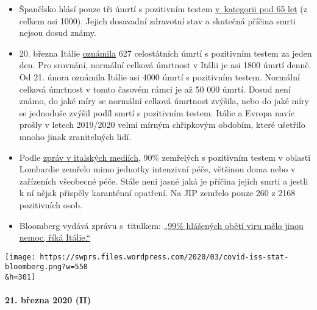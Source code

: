 \begin{itemize}
\tightlist
\item
  Španělsko hlásí pouze tři úmrtí s pozitivním testem
  \href{https://www.20minutos.es/noticia/4193883/0/media-edad-coronavirus-espana/}{v~kategorii
  pod 65 let} (z celkem asi 1000). Jejich dosavadní zdravotní stav a
  skutečná příčina smrti nejsou dosud známy.
\item
  20. března Itálie
  \href{https://www.msn.com/en-au/news/coronavirus/italy-coronavirus-deaths-surge-by-627-in-a-day-lifting-total-death-toll-to-4032/ar-BB11tDnS}{oznámila}
  627 celostátních úmrtí s pozitivním testem za jeden den. Pro srovnání,
  normální celková úmrtnost v Itálii je asi 1800 úmrtí denně. Od 21.
  února oznámila Itálie asi 4000 úmrtí s pozitivním testem. Normální
  celková úmrtnost v tomto časovém rámci je až 50 000 úmrtí. Dosud není
  známo, do jaké míry se normální celková úmrtnost zvýšila, nebo do jaké
  míry se jednoduše zvýšil podíl smrtí s pozitivním testem. Itálie a
  Evropa navíc prošly v letech 2019/2020 velmi mírným chřipkovým
  obdobím, které ušetřilo mnoho jinak zranitelných lidí.
\item
  Podle
  \href{https://www.tgcom24.mediaset.it/cronaca/coronavirus-in-lombardia-9-morti-su-10-mai-giunti-in-terapia-intensiva_16362350-202002a.shtml}{zpráv
  v italských mediích}, 90\% zemřelých s pozitivním testem v oblasti
  Lombardie zemřelo mimo jednotky intenzivní péče, většinou doma nebo v
  zařízeních všeobecné péče. Stále není jasné jaká je příčina jejich
  smrti a jestli k ní nějak přispěly karanténní opatření. Na JIP zemřelo
  pouze 260 z 2168 pozitivních osob.
\item
  Bloomberg vydává zprávu s~titulkem:
  \href{https://www.bloomberg.com/news/articles/2020-03-18/99-of-those-who-died-from-virus-had-other-illness-italy-says}{„99\%
  hlášených obětí viru mělo jinou nemoc, říká Itálie.``}
\end{itemize}

\texttt{[image: https://swprs.files.wordpress.com/2020/03/covid-iss-stat-bloomberg.png?w=550\\\&h=301]}

\hypertarget{21-bux159ezna-2020-ii}{%
\paragraph{21. března 2020 (II)}\label{21-bux159ezna-2020-ii}}

